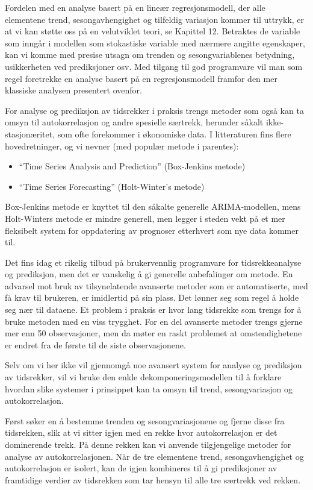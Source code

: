 Fordelen med en analyse basert på en lineær regresjonsmodell, der alle
elementene trend, sesongavhengighet og tilfeldig variasjon kommer til uttrykk,
er at vi kan støtte oss på en velutviklet teori, se Kapittel 12.
Betraktes de variable som inngår i modellen som stokastiske variable med 
nærmere angitte egenskaper, kan vi komme
med presise utsagn om trenden og sesongvariablenes betydning, usikkerheten
ved prediksjoner osv.  Med tilgang til god programvare vil man som
regel foretrekke en analyse basert på en regresjonsmodell framfor den mer
klassiske analysen presentert ovenfor.


For analyse og prediksjon av tidsrekker i praksis trengs metoder som også 
kan ta omsyn til autokorrelasjon og andre spesielle særtrekk,
herunder såkalt ikke-sta\-sjo\-næ\-ritet, som ofte
forekommer i økonomiske data. I litteraturen fins flere hovedretninger,
og vi nevner (med populær metode i parentes):
\begin{itemize}
\item  ``Time Series Analysis and Prediction'' (Box-Jenkins metode)
\item ``Time Series Forecasting'' (Holt-Winter's metode)
\end{itemize}
Box-Jenkins metode er knyttet til den såkalte generelle ARIMA-modellen,
mens Holt-Winters metode er mindre generell, men legger i steden vekt
på et mer fleksibelt system for oppdatering av prognoser etterhvert som 
nye data kommer til. 

Det fins idag et rikelig tilbud på brukervennlig programvare for
tids\-rekke\-analyse og prediksjon, men det er vanskelig å gi generelle
 anbefalinger om metode. En advarsel mot bruk av tilsynelatende
avanserte metoder som er automatiserte, med få krav til brukeren,
er imidlertid på sin plass. Det lønner seg som regel å
holde seg nær til dataene.
Et problem i praksis er hvor lang tidsrekke som trengs for å bruke
metoden med en viss trygghet. For en del avanserte metoder trengs gjerne
mer enn 50 observasjoner, men da møter en raskt problemet at
omstendighetene er endret fra de første til de siste observasjonene.

Selv om vi her ikke vil gjennomgå noe avansert system for
analyse og prediksjon av tidsrekker, vil vi bruke den enkle
dekomponeringsmodellen til å forklare hvordan slike systemer i prinsippet
kan ta omsyn til trend, sesongvariasjon og autokorrelasjon.

Først søker en å bestemme trenden og sesongvariasjonene og fjerne 
disse fra tidsrekken, slik at vi sitter igjen med en rekke hvor 
autokorrelasjon er det dominerende trekk.  På denne rekken kan vi anvende
tilgjengelige metoder for analyse av autokorrelasjonen. Når de tre 
elementene trend, sesongavhengighet og autokorrelasjon er isolert, kan de 
igjen kombineres til å gi prediksjoner av framtidige verdier av tidsrekken
som tar hensyn til alle tre særtrekk ved rekken.

